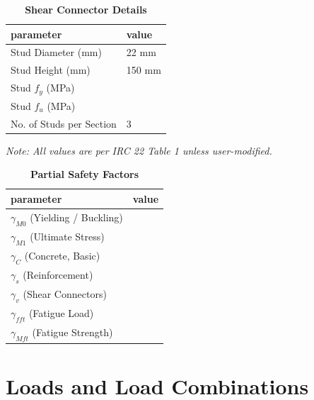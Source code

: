 \documentclass[12pt,a4paper]{report}
\numberwithin{table}{chapter}
\numberwithin{figure}{chapter}
\begin{document}
\label{subsec:shear-connectors}

\vspace{2.2em}

\vspace{0.4em}
\begin{longtable}{|L{5.5cm}|p{10.0cm}|}
\caption{\textbf{Shear Connector Details}}
\hline
\textbf{parameter} & \textbf{value} \\
\hline
\textnormal{Stud Diameter (mm)} & 22 mm \\[6pt]
\hline
\textnormal{Stud Height (mm)} & 150 mm \\[6pt]
\hline
\textnormal{Stud $f_y$ (MPa)} &  \\[6pt]
\hline
\textnormal{Stud $f_u$ (MPa)} &  \\[6pt]
\hline
\textnormal{No. of Studs per Section} & 3 \\[6pt]
\hline
\end{longtable}



\label{subsec:safety-factors}

\vspace{2.2em}

\vspace{0.3em}
\noindent\textit{Note: All values are per IRC 22 Table 1 unless user-modified.}

\vspace{0.4em}
\begin{longtable}{|L{5.5cm}|p{10.0cm}|}
\caption{\textbf{Partial Safety Factors}}
\hline
\textbf{parameter} & \textbf{value} \\
\hline
\textnormal{$\gamma_{M0}$ (Yielding / Buckling)} &  \\[6pt]
\hline
\textnormal{$\gamma_{M1}$ (Ultimate Stress)} &  \\[6pt]
\hline
\textnormal{$\gamma_C$ (Concrete, Basic)} &  \\[6pt]
\hline
\textnormal{$\gamma_s$ (Reinforcement)} &  \\[6pt]
\hline
\textnormal{$\gamma_v$ (Shear Connectors)} &  \\[6pt]
\hline
\textnormal{$\gamma_{fft}$ (Fatigue Load)} &  \\[6pt]
\hline
\textnormal{$\gamma_{Mft}$ (Fatigue Strength)} &  \\[6pt]
\hline
\end{longtable}


\chapter{Loads and Load Combinations}
\end{document}
